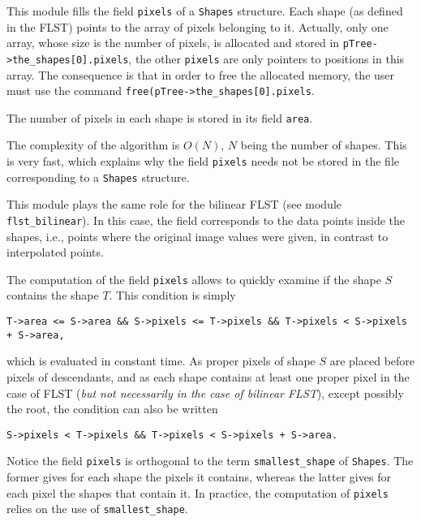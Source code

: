 This module fills the field \verb+pixels+ of a \verb+Shapes+ structure.
Each shape (as defined in the FLST) points to the array of
pixels belonging to it. Actually, only one array, whose size
is the number of pixels, is allocated and stored in
\verb+pTree->the_shapes[0].pixels+, the other \verb+pixels+ are only
pointers to positions in this array.
The consequence is that in order to free the allocated memory, the user must
use the command \verb+free(pTree->the_shapes[0].pixels+.

The number of pixels in each shape is stored in its field \verb+area+.

The complexity of the algorithm is $O(N)$, $N$ being the number of
shapes. This is very fast, which explains why the field \verb+pixels+ needs
not be stored in the file corresponding to a \verb+Shapes+ structure.

This module plays the same role for the bilinear FLST (see module
\verb+flst_bilinear+). In this case, the field corresponds to the data
points inside the shapes, i.e., points where the original image values were
given, in contrast to interpolated points.

The computation of the field \verb+pixels+ allows to quickly examine if the
shape $S$ contains the shape $T$. This condition is simply
\begin{verbatim}
T->area <= S->area && S->pixels <= T->pixels && T->pixels < S->pixels + S->area,
\end{verbatim}
which is evaluated in constant time. As proper pixels of shape
$S$ are placed before pixels of descendants, and as each shape contains at
least one proper pixel in the case of FLST ({\em but not necessarily in the
case of bilinear FLST}), except possibly the root, the condition can also
be written 
\begin{verbatim}
S->pixels < T->pixels && T->pixels < S->pixels + S->area.
\end{verbatim}

Notice the field \verb+pixels+ is orthogonal to the term
\verb+smallest_shape+ of \verb+Shapes+. The former gives for each shape
the pixels it contains, whereas the latter gives for each pixel the shapes
that contain it. In practice, the computation of \verb+pixels+ relies on the
use of \verb+smallest_shape+.

